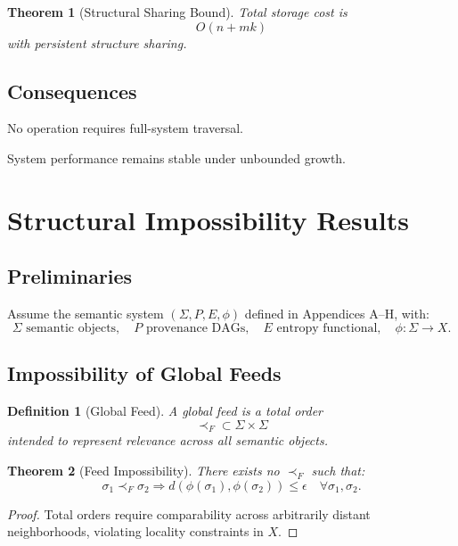\documentclass[11pt]{article}
\newtheorem{definition}{Definition}
\newtheorem{theorem}{Theorem}
\begin{document}
\begin{theorem}[Structural Sharing Bound]
Total storage cost is
\[
O(n + mk)
\]
with persistent structure sharing.
\end{theorem}

\subsection{Consequences}

\begin{corollary}
No operation requires full-system traversal.
\end{corollary}

\begin{corollary}
System performance remains stable under unbounded growth.
\end{corollary}

\section{Structural Impossibility Results}

\subsection{Preliminaries}

Assume the semantic system $(\Sigma, P, E, \phi)$ defined in Appendices A–H, with:
\[
\Sigma \text{ semantic objects}, \quad
P \text{ provenance DAGs}, \quad
E \text{ entropy functional}, \quad
\phi : \Sigma \to X.
\]

\subsection{Impossibility of Global Feeds}

\begin{definition}[Global Feed]
A global feed is a total order
\[
\prec_F \subset \Sigma \times \Sigma
\]
intended to represent relevance across all semantic objects.
\end{definition}

\begin{theorem}[Feed Impossibility]
There exists no $\prec_F$ such that:
\[
\sigma_1 \prec_F \sigma_2 \Rightarrow
d(\phi(\sigma_1), \phi(\sigma_2)) \le \epsilon
\quad \forall \sigma_1,\sigma_2.
\]
\end{theorem}

\begin{proof}
Total orders require comparability across arbitrarily distant neighborhoods, violating
locality constraints in $X$.
\end{proof}
\end{document}
